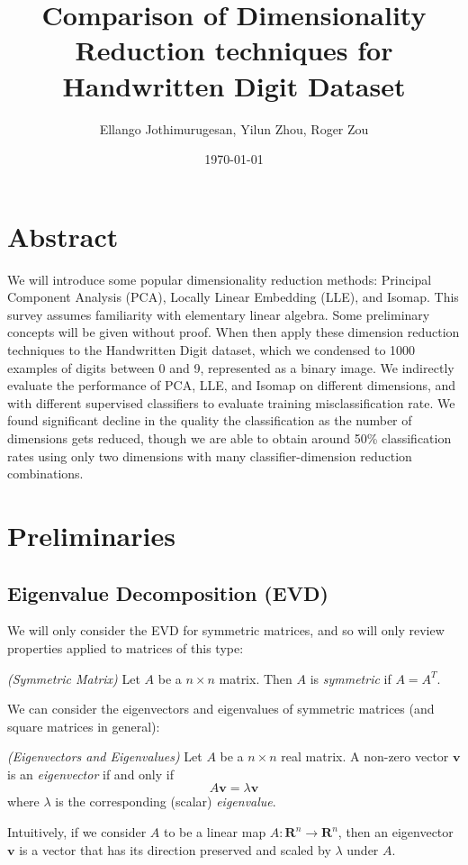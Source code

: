 \documentclass[11pt]{article}
\title{\textbf{Comparison of Dimensionality Reduction techniques for Handwritten Digit Dataset}}
\author{Ellango Jothimurugesan, Yilun Zhou, Roger Zou}
\date{\today}
\newenvironment{definition}[1][Definition]{\begin{trivlist}
\item[\hskip \labelsep {\bfseries #1}]}{\end{trivlist}}
\begin{document}
\maketitle


\section*{Abstract}
We will introduce some popular dimensionality reduction methods: Principal Component Analysis (PCA), Locally Linear Embedding (LLE), and Isomap. This survey assumes familiarity with elementary linear algebra. Some preliminary concepts will be given without proof. When then apply these dimension reduction techniques to the Handwritten Digit dataset, which we condensed to 1000 examples of digits between 0 and 9, represented as a binary image. We indirectly evaluate the performance of PCA, LLE, and Isomap on different dimensions, and with different supervised classifiers to evaluate training misclassification rate. We found significant decline in the quality the classification as the number of dimensions gets reduced, though we are able to obtain around 50\% classification rates using only two dimensions with many classifier-dimension reduction combinations. 


\section*{Preliminaries}

\subsection*{Eigenvalue Decomposition (EVD)}

We will only consider the EVD for symmetric matrices, and so will only review properties applied to matrices of this type:
\begin{definition}
\emph{(Symmetric Matrix)}
Let $A$ be a $n \times n$ matrix. Then $A$ is \textit{symmetric} if $A = A^T$.
\end{definition}

We can consider the eigenvectors and eigenvalues of symmetric matrices (and square matrices in general):
\begin{definition}
\emph{(Eigenvectors and Eigenvalues)}
Let $A$ be a $n \times n$ real matrix. A non-zero vector $\mathbf{v}$ is an \textit{eigenvector} if and only if
\[A\mathbf{v} = \lambda \mathbf{v}\]
where $\lambda$ is the corresponding (scalar) \textit{eigenvalue}.
\end{definition}
Intuitively, if we consider $A$ to be a linear map $A: \mathbf{R}^n \rightarrow \mathbf{R}^n$, then an eigenvector $\mathbf{v}$ is a vector that has its direction preserved and scaled by $\lambda$ under $A$. \\
\end{document}
